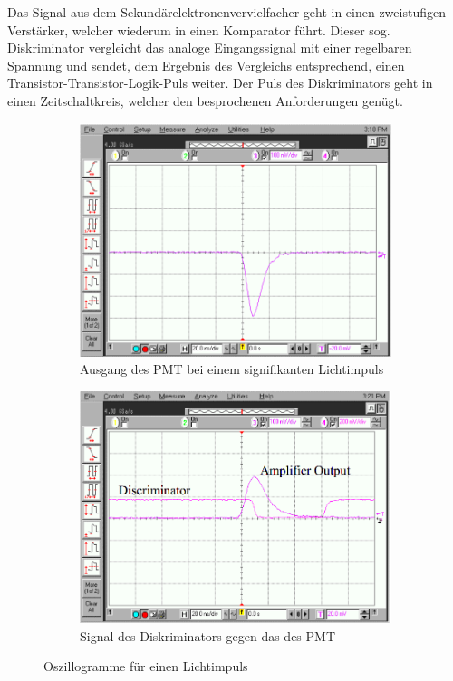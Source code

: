 \documentclass[numbers=noenddot,12pt,a4paper]{scrartcl}
\begin{document}
Das Signal aus dem Sekundärelektronenvervielfacher geht in einen zweistufigen Verstärker, welcher wiederum in einen Komparator führt. Dieser sog. Diskriminator vergleicht das analoge Eingangssignal mit einer regelbaren Spannung und sendet, dem Ergebnis des Vergleichs entsprechend, einen Transistor-Transistor-Logik-Puls weiter. Der Puls des Diskriminators geht in einen Zeitschaltkreis, welcher den besprochenen Anforderungen genügt.
\begin{figure}[H]
\begin{subfigure}[htbp]{0.48\textwidth}
	\centering
	\includegraphics[width=\textwidth]{PMT.png}
	\caption{Ausgang des PMT bei einem signifikanten Lichtimpuls}
\end{subfigure}
\hspace{0.5cm}
\begin{subfigure}[htbp]{0.48\textwidth}
	\centering
	\vspace{-0.4cm}
	\includegraphics[width=\textwidth]{diskr.png}
	\caption{Signal des Diskriminators gegen das des PMT}
\end{subfigure}
\caption{Oszillogramme für einen Lichtimpuls}\label{img:alles}
\end{figure}
\newpage
\end{document}
